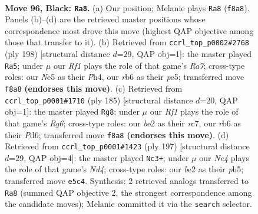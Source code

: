 \documentclass[11pt]{article}
\begin{document}
\clearpage

\begin{figure}[p]\centering
\begin{subfigure}{0.46\textwidth}\centering
\resizebox{\linewidth}{!}{%
\newchessgame
\chessboard[
  setfen={5r2/3k4/PR6/4n1P1/8/4K2P/2P1B3/8 b - - 0 96},
  showmover=false,
  pgfstyle=straightmove, color=movearrow, markmove={f8-a8}
]}
\caption{}
\end{subfigure}\hfill
\begin{subfigure}{0.46\textwidth}\centering
\resizebox{\linewidth}{!}{%
\newchessgame
\chessboard[
  setfen={8/R7/3p1kb1/4p2p/7P/4K3/8/8 w - - 8 100},
  showmover=false,
  pgfstyle=straightmove, color=movearrow, markmove={a7-a5}
]}
\caption{}
\end{subfigure}
\\[4pt]
\begin{subfigure}{0.46\textwidth}\centering
\resizebox{\linewidth}{!}{%
\newchessgame
\chessboard[
  setfen={8/P1R5/3p4/3P4/3n1k2/6r1/KP6/8 b - - 0 93},
  showmover=false,
  pgfstyle=straightmove, color=movearrow, markmove={g3-g8}
]}
\caption{}
\end{subfigure}\hfill
\begin{subfigure}{0.46\textwidth}\centering
\resizebox{\linewidth}{!}{%
\newchessgame
\chessboard[
  setfen={8/8/R5P1/3n3P/5k2/1r6/4K3/8 b - - 0 99},
  showmover=false,
  pgfstyle=straightmove, color=movearrow, markmove={d5-c3}
]}
\caption{}
\end{subfigure}
\caption{\textbf{Move 96, Black: \texttt{Ra8}.} (a) Our position; Melanie plays \texttt{Ra8} (\texttt{f8a8}). Panels (b)--(d) are the retrieved master positions whose correspondence most drove this move (highest QAP objective among those that transfer to it). (b) Retrieved from \texttt{ccrl\_top\_p0002\#2768} (ply 198) [structural distance $d$=29, QAP obj=1]: the master played \texttt{Ra5}; under $\mu$ our \emph{Rf1} plays the role of that game's \emph{Ra7}; cross-type roles: our \emph{N}e5 as their \emph{P}h4, our \emph{r}b6 as their \emph{p}e5; transferred move \texttt{f8a8} \textbf{(endorses this move)}. (c) Retrieved from \texttt{ccrl\_top\_p0001\#1710} (ply 185) [structural distance $d$=20, QAP obj=1]: the master played \texttt{Rg8}; under $\mu$ our \emph{Rf1} plays the role of that game's \emph{Rg6}; cross-type roles: our \emph{b}e2 as their \emph{r}c7, our \emph{r}b6 as their \emph{P}d6; transferred move \texttt{f8a8} \textbf{(endorses this move)}. (d) Retrieved from \texttt{ccrl\_top\_p0001\#1423} (ply 197) [structural distance $d$=29, QAP obj=4]: the master played \texttt{Nc3+}; under $\mu$ our \emph{Ne4} plays the role of that game's \emph{Nd4}; cross-type roles: our \emph{b}e2 as their \emph{p}h5; transferred move \texttt{e5c4}. Synthesis: 2 retrieved analogs transferred to \texttt{Ra8} (summed QAP objective 2, the strongest correspondence among the candidate moves); Melanie committed it via the \texttt{search} selector.}
\label{fig:thought-m191}
\end{figure}
\end{document}

